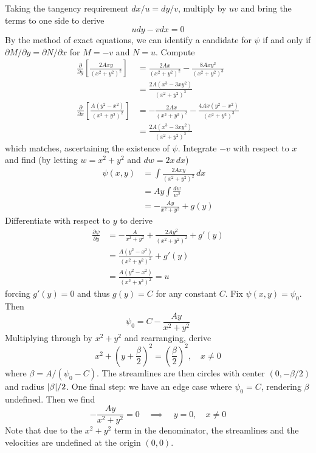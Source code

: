 \documentclass[a4paper]{article}
\begin{document}
Taking the tangency requirement \( dx / u = dy / v \), multiply by \( uv \) and bring the terms to one side to derive
\[
	udy - vdx = 0 
\]
By the method of exact equations, we can identify a candidate for \( \psi \) if and only if \( \partial M / \partial y = \partial N / \partial x \) for \( M = -v \) and \( N = u \). Compute
\begin{align*}
	\frac{\partial }{\partial y}\!\left[ \frac{2Axy}{\!\left( x^{2} + y^{2} \right)^{2}} \right] & = \frac{2Ax}{\!\left( x^{2} + y^{2} \right)^{2}} - \frac{8Axy^{2}}{\!\left( x^{2} + y^{2} \right)^{3}} \\
	 & = \frac{2A \!\left( x^{3} - 3xy^{2} \right)}{\!\left( x^{2} + y^{2} \right)^{3}} \\ 
	\frac{\partial }{\partial x}\!\left[ \frac{A \!\left( y^{2} - x^{2} \right)}{\!\left( x^{2} + y^{2} \right)^{2}} \right] & = -\frac{2Ax}{\!\left( x^{2} + y^{2} \right)^{2}} - \frac{4Ax \!\left( y^{2} - x^{2} \right)}{\!\left( x^{2} + y^{2} \right)^{3}} \\
																 & = \frac{2A \!\left( x^{3} - 3xy^{2} \right)}{\!\left( x^{2} + y^{2} \right)^{3}}
\end{align*}
which matches, ascertaining the existence of \( \psi \). Integrate \( -v \) with respect to \( x \) and find (by letting \( w = x^{2} + y^{2} \) and \( dw = 2x \, dx \))
\begin{align*}
	\psi \!\left( x,y \right) & = \int \frac{2Axy}{\!\left( x^{2} + y^{2} \right)^{2}} \, dx \\
				  & = Ay \int \frac{dw}{w^{2}} \\
				  & = -\frac{Ay}{x^{2} + y^{2}} + g \!\left( y \right)
\end{align*}
Differentiate with respect to \( y \) to derive
\begin{align*}
	\frac{\partial \psi}{\partial y} & = -\frac{A}{x^{2} + y^{2}} + \frac{2Ay^{2}}{\!\left( x^{2} + y^{2} \right)^{2}} + g'\!\left( y \right) \\
					 & = \frac{A \!\left( y^{2} - x^{2} \right)}{\!\left( x^{2} + y^{2} \right)^{2}} + g'\!\left( y \right) \\
					 & = \frac{A \!\left( y^{2} - x^{2} \right)}{\!\left( x^{2} + y^{2} \right)^{2}} = u
\end{align*}
forcing \( g'\!\left( y \right) = 0 \) and thus \( g \!\left( y \right) = C \) for any constant \( C \). Fix \( \psi \!\left( x,y \right) = \psi_{0} \). Then 
\[
	\psi_{0} = C - \frac{Ay}{x^{2} + y^{2}} 
\]
Multiplying through by \( x^{2} + y^{2} \) and rearranging, derive
\[
	x^{2} + \!\left( y + \frac{\beta}{2} \right)^{2} = \!\left( \frac{\beta}{2} \right)^{2}, \quad x \neq 0 
\]
where \( \beta = A / \!\left( \psi_{0} - C \right) \). The streamlines are then circles with center \( \!\left( 0, -\beta / 2 \right) \) and radius \( \abs{\beta} / 2 \). One final step: we have an edge case where \( \psi_{0} = C \), rendering \( \beta \) undefined. Then we find
\[
	-\frac{Ay}{x^{2} + y^{2}} = 0 \quad \implies \quad y = 0, \quad x \neq 0
\]
Note that due to the \( x^{2} + y^{2} \) term in the denominator, the streamlines and the velocities are undefined at the origin \( \!\left( 0,0 \right) \).
\end{document}
